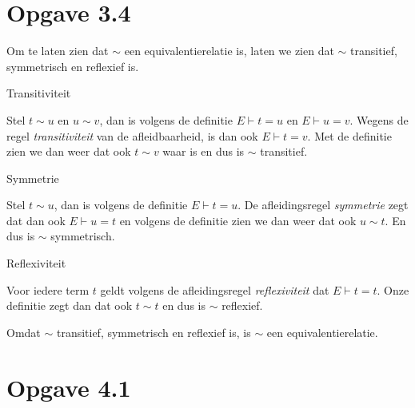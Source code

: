 \documentclass[a4paper,11pt]{article}
\begin{document}
\section*{Opgave 3.4}

Om te laten zien dat $\sim$ een equivalentierelatie is, laten we zien dat $\sim$
transitief, symmetrisch en reflexief is.

\begin{description}

\item{Transitiviteit}

  Stel $t \sim u$ en $u \sim v$, dan is volgens de definitie $E \vdash t = u$ en
  $E \vdash u = v$. Wegens de regel \emph{transitiviteit} van de
  afleidbaarheid, is dan ook $E \vdash t = v$. Met de definitie zien we dan
  weer dat ook $t \sim v$ waar is en dus is $\sim$ transitief.

\item{Symmetrie}

  Stel $t \sim u$, dan is volgens de definitie $E \vdash t = u$. De
  afleidingsregel \emph{symmetrie} zegt dat dan ook $E \vdash u = t$ en
  volgens de definitie zien we dan weer dat ook $u \sim t$. En dus is $\sim$
  symmetrisch.

\item{Reflexiviteit}

  Voor iedere term $t$ geldt volgens de afleidingsregel \emph{reflexiviteit}
  dat $E \vdash t = t$. Onze definitie zegt dan dat ook $t \sim t$ en dus is
  $\sim$ reflexief.

\end{description}

Omdat $\sim$ transitief, symmetrisch en reflexief is, is $\sim$ een
equivalentierelatie.


\section*{Opgave 4.1}
\end{document}
